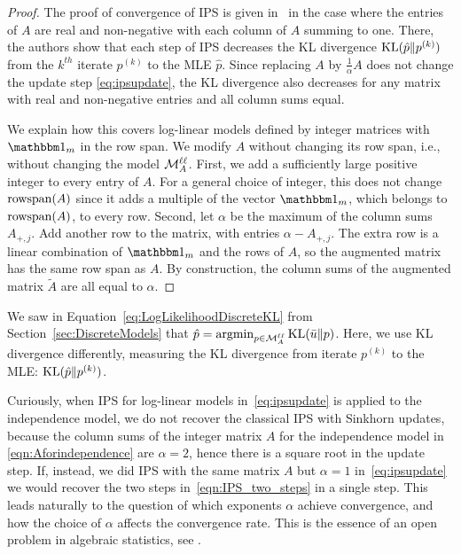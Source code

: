 \begin{proof}
	The proof of convergence of IPS is given in~\cite[Theorem~1]{IPS-DR}
	in the case where the entries of $A$ are real and non-negative with each column of $A$ summing to one.
	There, the authors show that each step of IPS decreases the KL divergence $\operatorname{KL}(\hat{p} \| p^{(k)})$ from the $k^{th}$ iterate $p^{(k)}$ to the MLE $\hat{p}$.  Since replacing $A$ by $\frac{1}{\alpha}A$ does not change the update step \eqref{eq:ipsupdate}, the KL divergence also decreases for any matrix with real and non-negative entries and all column sums equal.
	
	We explain how this covers log-linear models defined by integer matrices with $\ones_m$ in the row span.
	We modify $A$ without changing its row span, i.e., without changing the model $\mathcal{M}^{\mathtt{\ell \ell}}_A$.
	First, we add a sufficiently large positive integer to every entry of $A$. For a general choice of integer, this does not change $\operatorname{rowspan}(A)$ since it adds a multiple of the vector $\ones_m$, which belongs to $\operatorname{rowspan}(A)$, to every row. 
	Second, let $\alpha$ be the maximum of the column sums $A_{+,j}$. 
	Add another row to the matrix, with entries $\alpha - A_{+,j}$. 
	The extra row is a linear combination of $\ones_m$ and the rows of $A$, so the augmented matrix has the same row span as $A$. By construction, the column sums of the augmented matrix $\tilde{A}$ are all equal to $\alpha$. 
\end{proof}

\begin{remark}
	We saw in Equation~\eqref{eq:LogLikelihoodDiscreteKL} from Section~\ref{sec:DiscreteModels} that $\hat{p} = {\rm argmin}_{p \in \mathcal{M}^{\mathtt{\ell \ell}}_A} \operatorname{KL} ( \bar{u} \| p )$. Here, we use KL divergence differently, measuring the KL divergence from iterate $p^{(k)}$ to the MLE: $\operatorname{KL}( \hat{p} \| p^{(k)} )$.
	\hfill\remSymbol
\end{remark}

Curiously, when  IPS for log-linear models in~\eqref{eq:ipsupdate} is applied to the independence model, we do not recover the classical IPS with Sinkhorn updates, because the column sums of the integer matrix $A$ for the independence model in \eqref{eqn:Aforindependence} are $\alpha = 2$, hence there is a square root in the update step. 
If, instead, we did IPS with the same matrix $A$ but $\alpha=1$ in~\eqref{eq:ipsupdate} we would recover the two steps in~\eqref{eqn:IPS_two_steps} in a single step. 
This leads naturally to the question of which exponents $\alpha$ achieve convergence, and how the choice of $\alpha$ affects the convergence rate. This is the essence of an open problem in algebraic statistics, see \cite[Section~7.3]{LecturesAlgebraicStatistics}.

